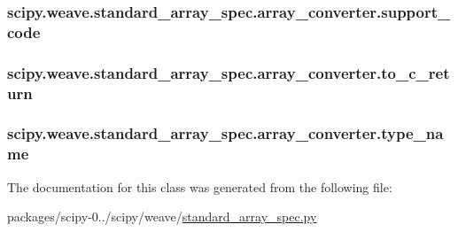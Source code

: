 \subsubsection[{support\+\_\+code}]{\setlength{\rightskip}{0pt plus 5cm}scipy.\+weave.\+standard\+\_\+array\+\_\+spec.\+array\+\_\+converter.\+support\+\_\+code}\label{classscipy_1_1weave_1_1standard__array__spec_1_1array__converter_ac9b022698cf9804cd22490f257f2bc8b}
\hypertarget{classscipy_1_1weave_1_1standard__array__spec_1_1array__converter_a87ef6cd1f32de9ea3e4bdab765cd76dc}{}
\subsubsection[{to\+\_\+c\+\_\+return}]{\setlength{\rightskip}{0pt plus 5cm}scipy.\+weave.\+standard\+\_\+array\+\_\+spec.\+array\+\_\+converter.\+to\+\_\+c\+\_\+return}\label{classscipy_1_1weave_1_1standard__array__spec_1_1array__converter_a87ef6cd1f32de9ea3e4bdab765cd76dc}
\hypertarget{classscipy_1_1weave_1_1standard__array__spec_1_1array__converter_ac2f04195767ca6aa372ba7514c824ea7}{}
\subsubsection[{type\+\_\+name}]{\setlength{\rightskip}{0pt plus 5cm}scipy.\+weave.\+standard\+\_\+array\+\_\+spec.\+array\+\_\+converter.\+type\+\_\+name}\label{classscipy_1_1weave_1_1standard__array__spec_1_1array__converter_ac2f04195767ca6aa372ba7514c824ea7}


The documentation for this class was generated from the following file\+:\begin{DoxyCompactItemize}
\item 
packages/scipy-\/0../scipy/weave/\hyperlink{standard__array__spec_8py}{standard\+\_\+array\+\_\+spec.\+py}\end{DoxyCompactItemize}

